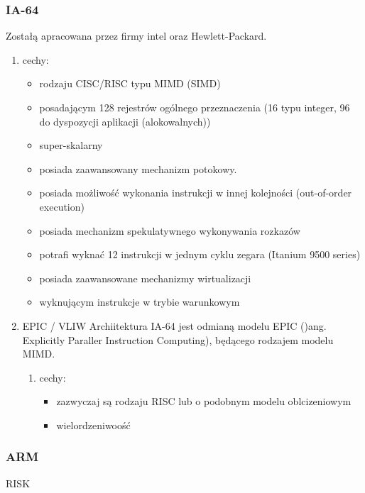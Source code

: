 \documentclass[11pt]{article}
\begin{document}
\subsubsection{IA-64}
\label{sec:orgee2039a}
Zostałą apracowana przez firmy intel oraz Hewlett-Packard.
\begin{enumerate}
\item cechy:
\label{sec:org807ba1f}
\begin{itemize}
\item rodzaju CISC/RISC typu MIMD (SIMD)
\item posadającym 128 rejestrów ogólnego przeznaczenia (16 typu integer, 96 do dyspozycji aplikacji (alokowalnych))
\item super-skalarny
\item posiada zaawansowany mechanizm potokowy.
\item posiada możliwość wykonania instrukcji w innej kolejności (out-of-order execution)
\item posiada mechanizm spekulatywnego wykonywania rozkazów
\item potrafi wyknać 12 instrukcji w jednym cyklu zegara (Itanium 9500 series)
\item posiada zaawansowane mechanizmy wirtualizacji
\item wyknującym instrukcje w trybie warunkowym
\end{itemize}
\item EPIC / VLIW
\label{sec:org4b5e1f1}
Archiitektura IA-64 jest odmianą modelu EPIC ()ang. Explicitly Paraller Instruction Computing), będącego rodzajem modelu MIMD.
\begin{enumerate}
\item cechy:
\label{sec:org2aa273a}
\begin{itemize}
\item zazwyczaj są rodzaju RISC lub o podobnym modelu oblcizeniowym
\item wielordzeniwoość
\end{itemize}
\end{enumerate}
\end{enumerate}
\subsubsection{ARM}
\label{sec:orgf25b9f6}
RISK
\end{document}
